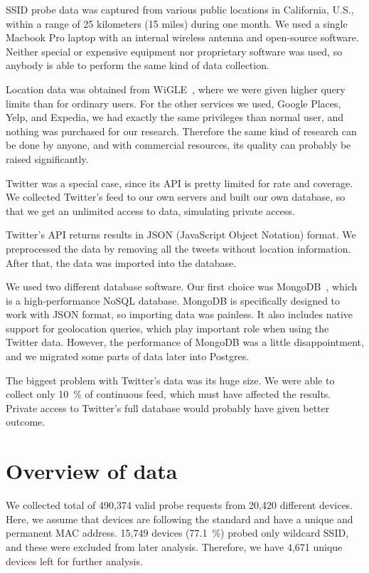 \documentclass[12pt,a4paper,oneside,pdftex]{report}
\begin{document}
SSID probe data was captured from various public locations in California, U.S., within a range of 25 kilometers (15 miles) during one month. We used a single Macbook Pro laptop with an internal wireless antenna and open-source software. Neither special or expensive equipment nor proprietary software was used, so anybody is able to perform the same kind of data collection.

Location data was obtained from WiGLE~\cite{wigle}, where we were given higher query limits than for ordinary users. For the other services we used, Google Places, Yelp, and Expedia, we had exactly the same privileges than normal user, and nothing was purchased for our research. Therefore the same kind of research can be done by anyone, and with commercial resources, its quality can probably be raised significantly.

Twitter was a special case, since its API is pretty limited for rate and coverage. We collected Twitter's feed to our own servers and built our own database, so that we get an unlimited access to data, simulating private access. 

Twitter's API returns results in JSON (JavaScript Object Notation) format. We preprocessed the data by removing all the tweets without location information. After that, the data was imported into the database.

We used two different database software. Our first choice was MongoDB~\cite{mongodb}, which is a high-performance NoSQL database. MongoDB is specifically designed to work with JSON format, so importing data was painless. It also includes native support for geolocation queries, which play important role when using the Twitter data. However, the performance of MongoDB was a little disappointment, and we migrated some parts of data later into Postgres.

The biggest problem with Twitter's data was its huge size. We were able to collect only 10~\% of continuous feed, which must have affected the results. Private access to Twitter's full database would probably have given better outcome.

\section{Overview of data}
\label{sec:data_overview}

We collected total of 490,374 valid probe requests from 20,420 different devices. Here, we assume that devices are following the standard and have a unique and permanent MAC address. 15,749 devices (77.1~\%) probed only wildcard SSID, and these were excluded from later analysis. Therefore, we have 4,671 unique devices left for further analysis.
\end{document}
